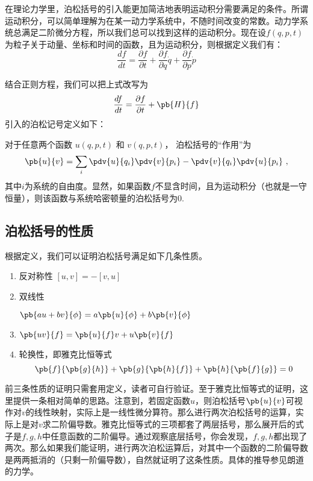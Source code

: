 
\begin{issues}
\issueDraft
\end{issues}

在理论力学里，泊松括号的引入能更加简洁地表明运动积分需要满足的条件。所谓运动积分，可以简单理解为在某一动力学系统中，不随时间改变的常数。动力学系统总满足二阶微分方程，所以我们总可以找到这样的运动积分。现在设$f(q,p,t)$为粒子关于动量、坐标和时间的函数，且为运动积分，则根据定义我们有：
\begin{equation}
\frac{df}{dt}=\frac{\partial f}{\partial t}+\frac{\partial f}{\partial q}\dot{q}+\frac{\partial f}{\partial p}\dot{ p}
\end{equation}

结合正则方程，我们可以把上式改写为
\begin{equation}
\frac{df}{dt}=\frac{\partial f}{\partial t}+\pb{H}{f}
\end{equation}
引入的泊松记号定义如下：


对于任意两个函数 $u(q, p, t)$ 和 $v(q, p, t)$， 泊松括号的“作用”为
\begin{equation}
\pb{u}{v} = \sum_i \pdv{u}{q_i}\pdv{v}{p_i} - \pdv{v}{q_i}\pdv{u}{p_i}~,
\end{equation}
其中$i$为系统的自由度。显然，如果函数$f$不显含时间，且为运动积分（也就是一守恒量），则该函数与系统哈密顿量的泊松括号为0.

\subsection{泊松括号的性质}
根据定义，我们可以证明泊松括号满足如下几条性质。
\begin{enumerate}
\item 反对称性
$[u,v]=-[v,u]$
\item 双线性

$\pb{au+bv}{\phi}=a\pb{u}{\phi}+b\pb{v}{\phi}$
\item 
$\pb{uv}{f}=\pb{u}{f}v+u\pb{v}{f}$

\item 轮换性，即雅克比恒等式
\begin{equation}
\pb{f}{\pb{g}{h}}+\pb{g}{\pb{h}{f}}+\pb{h}{\pb{f}{g}}=0
\end{equation}
\end{enumerate}
前三条性质的证明只需套用定义，读者可自行验证。至于雅克比恒等式的证明，这里提供一条相对简单的思路。注意到，若固定函数$u$，则泊松括号$\pb{u}{v}$可视作对$v$的线性映射，实际上是一线性微分算符。那么进行两次泊松括号的运算，实际上是对$v$求二阶偏导数。雅克比恒等式的三项都套了两层括号，那么展开后的式子是$f,g,h$中任意函数的二阶偏导。通过观察底层括号，你会发现，$f,g,h$都出现了两次。那么如果我们能证明，进行两次泊松运算后，对其中一个函数的二阶偏导数是两两抵消的（只剩一阶偏导数），自然就证明了这条性质。具体的推导参见朗道的力学。

